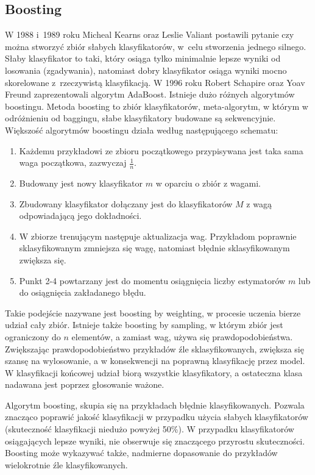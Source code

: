\subsection{Boosting}
W 1988 i 1989 roku Micheal Kearns oraz Leslie Valiant postawili pytanie czy można stworzyć zbiór słabych klasyfikatorów, w celu stworzenia jednego silnego. Słaby klasyfikator to taki, który osiąga tylko minimalnie lepsze wyniki od losowania (zgadywania), natomiast dobry klasyfikator osiąga wyniki mocno skorelowane z rzeczywistą klasyfikacją. W 1996 roku Robert Schapire oraz Yoav Freund zaprezentowali algorytm AdaBoost. Istnieje dużo różnych algorytmów boostingu. 
Metoda boosting to zbiór klasyfikatorów, meta-algorytm, w którym w odróżnieniu od baggingu, słabe klasyfikatory budowane są sekwencyjnie. Większość algorytmów boostingu działa według następującego schematu:
\begin{enumerate}
	\item Każdemu przykładowi ze zbioru początkowego przypisywana jest taka sama waga początkowa, zazwyczaj $\frac{1}{n}$.
	\item Budowany jest nowy klasyfikator $m$ w oparciu o zbiór z wagami.
	\item Zbudowany klasyfikator dołączany jest do klasyfikatorów $M$ z wagą odpowiadającą jego dokładności.
	\item W zbiorze trenującym następuje aktualizacja wag. Przykładom poprawnie sklasyfikowanym zmniejsza się wagę, natomiast  błędnie sklasyfikowanym zwiększa się.
	\item Punkt 2-4 powtarzany jest do momentu osiągnięcia liczby estymatorów $m$ lub do osiągnięcia zakładanego błędu. 
\end{enumerate}
Takie podejście nazywane jest boosting by weighting, w procesie uczenia bierze udział cały zbiór. Istnieje także boosting by sampling, w którym zbiór jest ograniczony do $n$ elementów, a zamiast wag, używa się prawdopodobieństwa. Zwiększając prawdopodobieństwo przykładów źle sklasyfikowanych, zwiększa się szansę na wylosowanie, a w konsekwencji na poprawną klasyfikację przez model. W klasyfikacji końcowej udział biorą wszystkie klasyfikatory, a ostateczna klasa nadawana jest poprzez głosowanie ważone.\par
Algorytm boosting, skupia się na przykładach błędnie klasyfikowanych. Pozwala znacząco poprawić jakość klasyfikacji w przypadku użycia słabych klasyfikatorów (skuteczność klasyfikacji niedużo powyżej 50\%). W przypadku klasyfikatorów osiągających lepsze wyniki, nie obserwuje się znaczącego przyrostu skuteczności. Boosting może wykazywać także, nadmierne dopasowanie do przykładów wielokrotnie źle klasyfikowanych. \par
